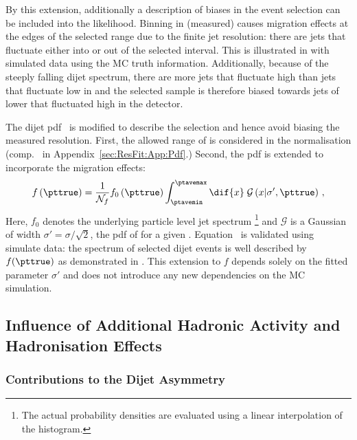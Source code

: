 By this extension, additionally a description of biases in the event selection can be included into the likelihood.
Binning in (measured) \ptave causes migration effects at the edges of the selected \ptave range due to the finite jet \pt resolution:
there are jets that fluctuate either into or out of the selected interval.
This is illustrated in  with simulated data using the MC truth information.
Additionally, because of the steeply falling dijet \pt spectrum, there are more jets that fluctuate high than jets that fluctuate low in \pt and the selected sample is therefore biased towards jets of lower \ptgen that fluctuated high in the detector.

The dijet pdf~ is modified to describe the
\ptave selection and hence avoid biasing the measured resolution.
First, the allowed range of \ptave is considered in the normalisation (comp.~ in Appendix~\ref{sec:ResFit:App:Pdf}.)
Second, the \pttrue pdf is extended to incorporate the migration effects:
\begin{equation}
  \label{eq:ResFit:DataDriven:ModifiedSpectrum}
  f\left(\pttrue\right) = \frac{1}{\mathcal{N}_{f}}
  f_{0}\left(\pttrue\right) \int^{\ptavemax}_{\ptavemin}\dif{x}\;\mathcal{G}\left(x|\sigma',\pttrue\right) \, ,
\end{equation}
Here, $f_{0}$ denotes the underlying particle level jet \pt spectrum \footnote{The actual probability densities are evaluated using a linear interpolation of the histogram.} and $\mathcal{G}$ is a Gaussian of width \mbox{$\sigma' = \sigma/\sqrt{2}$}, \ie the pdf of \ptave for a given \pttrue.
Equation~ is validated using simulate data:
the \ptgen spectrum of selected dijet events is well described by $f(\pttrue)$ as demonstrated in .
This extension to $f$ depends solely on the fitted parameter $\sigma'$ and does not introduce any new dependencies on the MC simulation.



\subsection{Influence of Additional Hadronic Activity and Hadronisation Effects}\label{sec:ResFit:DataDriven:AddJets}

\subsubsection{Contributions to the Dijet Asymmetry}\label{sec:ResFit:DataDriven:AddJets:Contributions}

